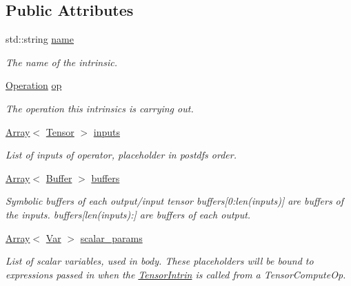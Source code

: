 \subsection*{Public Attributes}
\begin{DoxyCompactItemize}
\item 
std\+::string \hyperlink{classtvm_1_1te_1_1TensorIntrinNode_ac38bf30e4754ecb701de8f5b185873b3}{name}
\begin{DoxyCompactList}\small\item\em The name of the intrinsic. \end{DoxyCompactList}\item 
\hyperlink{classtvm_1_1te_1_1Operation}{Operation} \hyperlink{classtvm_1_1te_1_1TensorIntrinNode_a5a589bd81a76f0001f05ac0013e74f85}{op}
\begin{DoxyCompactList}\small\item\em The operation this intrinsics is carrying out. \end{DoxyCompactList}\item 
\hyperlink{classtvm_1_1Array}{Array}$<$ \hyperlink{classtvm_1_1te_1_1Tensor}{Tensor} $>$ \hyperlink{classtvm_1_1te_1_1TensorIntrinNode_ac28183d6ba30b33f76185b37d031559f}{inputs}
\begin{DoxyCompactList}\small\item\em List of inputs of operator, placeholder in postdfs order. \end{DoxyCompactList}\item 
\hyperlink{classtvm_1_1Array}{Array}$<$ \hyperlink{classtvm_1_1tir_1_1Buffer}{Buffer} $>$ \hyperlink{classtvm_1_1te_1_1TensorIntrinNode_a373d9c4dde9e8b6fb7038ebf65ecb8ea}{buffers}
\begin{DoxyCompactList}\small\item\em Symbolic buffers of each output/input tensor buffers\mbox{[}0\+:len(inputs)\mbox{]} are buffers of the inputs. buffers\mbox{[}len(inputs)\+:\mbox{]} are buffers of each output. \end{DoxyCompactList}\item 
\hyperlink{classtvm_1_1Array}{Array}$<$ \hyperlink{classtvm_1_1tir_1_1Var}{Var} $>$ \hyperlink{classtvm_1_1te_1_1TensorIntrinNode_a9bd674ec6c6a695ea81a3651e99a78f0}{scalar\+\_\+params}
\begin{DoxyCompactList}\small\item\em List of scalar variables, used in body. These placeholders will be bound to expressions passed in when the \hyperlink{classtvm_1_1te_1_1TensorIntrin}{Tensor\+Intrin} is called from a Tensor\+Compute\+Op. \end{DoxyCompactList}\item 

\end{DoxyCompactItemize}

